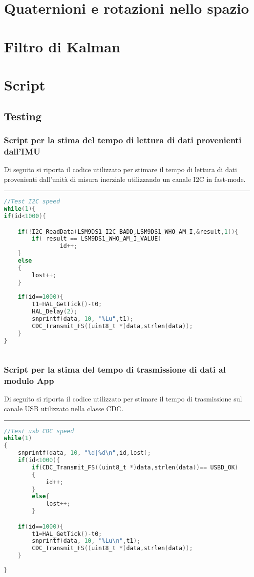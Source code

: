 \appendix
\chapter{Quaternioni e rotazioni nello spazio}
\label{app:rotazioni}


\chapter{Filtro di Kalman}
\label{app:kalman}


\chapter{Script}

\section{Testing}
\subsection{Script per la stima del tempo di lettura di dati provenienti dall'IMU }
\label{app:stimai2c}
Di seguito si riporta il codice utilizzato per stimare il tempo di lettura di dati provenienti dall'unità di misura inerziale utilizzando un canale I2C in fast-mode.\\
\noindent\rule{14.1cm}{0.4pt}
\begin{lstlisting}[language=C]
//Test I2C speed
while(1){
if(id<1000){

	if(!I2C_ReadData(LSM9DS1_I2C_BADD,LSM9DS1_WHO_AM_I,&result,1)){
		if( result == LSM9DS1_WHO_AM_I_VALUE)
				id++;
	}
	else
	{
		lost++;
	}
	
 	if(id==1000){
		t1=HAL_GetTick()-t0;
		HAL_Delay(2);
		snprintf(data, 10, "%Lu",t1);
		CDC_Transmit_FS((uint8_t *)data,strlen(data));
	}
}



\end{lstlisting}


\subsection{Script per la stima del tempo di trasmissione di dati al modulo App}
\label{app:stimausb}
Di seguito si riporta il codice utilizzato per stimare il tempo di trasmissione sul canale USB utilizzato nella classe CDC.\\
\noindent\rule{14.1cm}{0.4pt}

\begin{lstlisting}[language=C]
 //Test usb CDC speed
while(1)
{
	snprintf(data, 10, "%d|%d\n",id,lost);
	if(id<1000){
		if(CDC_Transmit_FS((uint8_t *)data,strlen(data))== USBD_OK)
		{
			id++;
		}
		else{
			lost++;
		}

	if(id==1000){
		t1=HAL_GetTick()-t0;
		snprintf(data, 10, "%Lu\n",t1);
		CDC_Transmit_FS((uint8_t *)data,strlen(data));
	}
	
}



\end{lstlisting}



